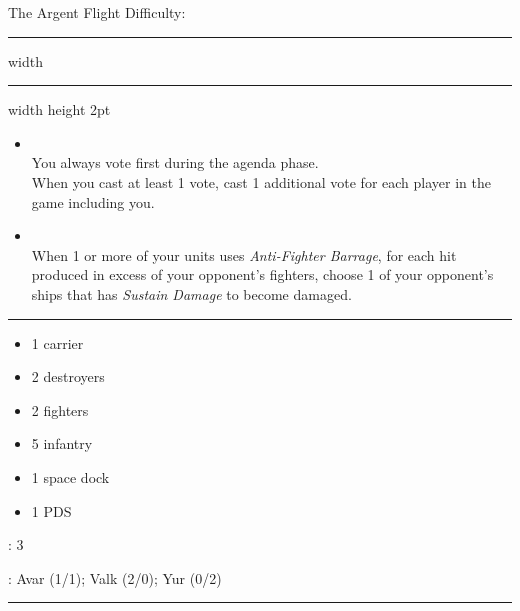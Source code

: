 {\handel \Huge The Argent Flight} \hfill {\Large Difficulty: \easy} \vspace{-4pt}\\
\hrule width \hsize \kern 1mm \hrule width \hsize height 2pt


\begin{multicols}{2}


\begin{itemize}
\item {}\\
You always vote first during the agenda phase.\\
When you cast at least 1 vote, cast 1 additional vote for each player in the game including you.
\item {}\\
When 1 or more of your units uses \emph{Anti-Fighter Barrage}, for each hit produced in excess of your opponent's fighters, choose 1 of your opponent's ships that has \emph{Sustain Damage} to become damaged.
\end{itemize}


\vspace{-10pt}\rule{\hsize}{0.4pt}\vspace{5pt}



\vspace{-5pt}
\begin{multicols}{2}
\begin{itemize}
\item 1 carrier
\item 2 destroyers
\item 2 fighters
\item 5 infantry
\item 1 space dock
\item 1 PDS
\end{itemize}
\end{multicols}

\vspace{-5pt}
: 3

\vspace{2pt}
: Avar (1/1); Valk (2/0); Yur (0/2)

\rule{\hsize}{0.4pt}\vspace{5pt}



\end{multicols}
